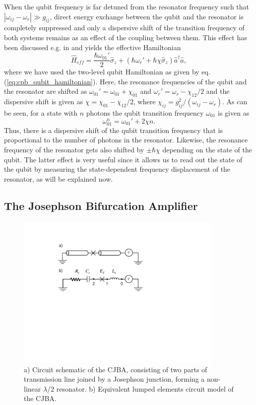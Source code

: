 When the qubit frequency is far detuned from the resonator frequency such that $|\omega_{ij}-\omega_r| \gg g_{ij}$, direct energy exchange between the qubit and the resonator is completely suppressed and only a dispersive shift of the transition frequency of both systems remains as an effect of the coupling between them. This effect has been discussed e.g. in \cite{blais_cavity_2004,koch_charge-insensitive_2007} and yields the effective Hamiltonian
%
\begin{equation}
\hat{H}_{eff} = \frac{\hbar\omega_{01}'}{2}\hat{\sigma}_z+(\hbar\omega_r'+\hbar \chi \hat{\sigma}_z)\hat{a}^\dagger \hat{a}, \label{eq:dispersive_interaction}
\end{equation}
%
where we have used the two-level qubit Hamiltonian as given by eq. (\ref{eq:cpb_qubit_hamiltonian}). Here, the resonance frequencies of the qubit and the resonator are shifted as $\omega_{01}'=\omega_{01}+\chi_{01}$ and $\omega_r' = \omega_{r}-\chi_{12}/2$ and the dispersive shift is given as $\chi=\chi_{01}-\chi_{12}/2$, where $\chi_{ij}=g_{ij}^2/(\omega_{ij}-\omega_r)$. As can be seen, for a state with $n$ photons the qubit transition frequency $\omega_{01}$ is given as
%
\begin{equation}
\omega_{01}^n = \omega_{01}'+2\chi n.
\end{equation}
%
Thus, there is a dispersive shift of the qubit transition frequency that is proportional to the number of photons in the resonator. Likewise, the resonance frequency of the resonator gets also shifted by $\pm\hbar\chi$ depending on the state of the qubit. The latter effect is very useful since it allows us to read out the state of the qubit by measuring the state-dependent frequency displacement of the resonator, as will be explained now.

\subsection{The Josephson Bifurcation Amplifier}

\begin{figure}
	\includegraphics[width=10cm]{"./material/figures/introduction/jba"}
	\caption{a) Circuit schematic of the CJBA, consisting of two parts of transmission line joined by a Josephson junction, forming a non-linear $\lambda/2$ resonator. b) Equivalent lumped elements circuit model of the CJBA.}
	\label{fig:cba_schematic}
\end{figure}

